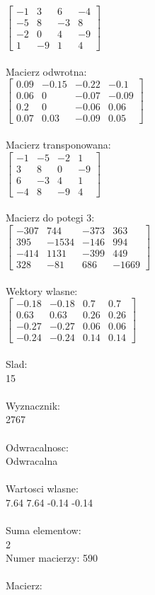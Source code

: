 \documentclass[a4paper,12pt]{article}
\begin{document}
$\begin{bmatrix} -1&3&6&-4\\-5&8&-3&8\\-2&0&4&-9\\1&-9&1&4 \end{bmatrix}$
\\
\\
Macierz odwrotna:\\

$\begin{bmatrix} 0.09&-0.15&-0.22&-0.1\\0.06&0&-0.07&-0.09\\0.2&0&-0.06&0.06\\0.07&0.03&-0.09&0.05 \end{bmatrix}$
\\
\\
Macierz transponowana:\\

$\begin{bmatrix} -1&-5&-2&1\\3&8&0&-9\\6&-3&4&1\\-4&8&-9&4 \end{bmatrix}$
\\
\\
Macierz do potegi 3:\\

$\begin{bmatrix} -307&744&-373&363\\395&-1534&-146&994\\-414&1131&-399&449\\328&-81&686&-1669 \end{bmatrix}$
\\
\\
Wektory wlasne:\\

$\begin{bmatrix} -0.18&-0.18&0.7&0.7\\0.63&0.63&0.26&0.26\\-0.27&-0.27&0.06&0.06\\-0.24&-0.24&0.14&0.14 \end{bmatrix}$
\\
\\
Slad:\\
15
\\
\\
Wyznacznik:\\
2767
\\
\\
Odwracalnosc:\\
Odwracalna
\\
\\
Wartosci wlasne:\\
7.64 7.64 -0.14 -0.14
\\
\\
Suma elementow:\\
2
\\
\newpage
Numer macierzy:
590
\\
\\
Macierz:\\
\end{document}
